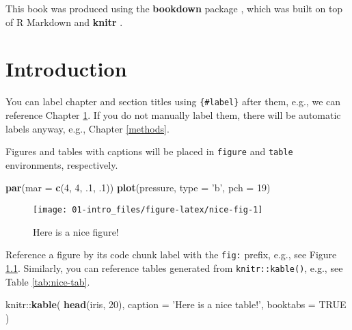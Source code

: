 \documentclass[]{book}
\newenvironment{Shaded}{\begin{snugshade}}{\end{snugshade}}
\newcommand{\KeywordTok}[1]{\textcolor[rgb]{0.13,0.29,0.53}{\textbf{{#1}}}}
\newcommand{\DataTypeTok}[1]{\textcolor[rgb]{0.13,0.29,0.53}{{#1}}}
\newcommand{\DecValTok}[1]{\textcolor[rgb]{0.00,0.00,0.81}{{#1}}}
\newcommand{\StringTok}[1]{\textcolor[rgb]{0.31,0.60,0.02}{{#1}}}
\newcommand{\OtherTok}[1]{\textcolor[rgb]{0.56,0.35,0.01}{{#1}}}
\newcommand{\NormalTok}[1]{{#1}}
\theoremstyle{definition}
\theoremstyle{definition}
\theoremstyle{remark}
\begin{document}
This book was produced using the \textbf{bookdown} package
\citep{R-bookdown}, which was built on top of R Markdown and
\textbf{knitr} \citep{xie2015}.

\chapter{Introduction}\label{intro}

You can label chapter and section titles using \texttt{\{\#label\}}
after them, e.g., we can reference Chapter \ref{intro}. If you do not
manually label them, there will be automatic labels anyway, e.g.,
Chapter \ref{methods}.

Figures and tables with captions will be placed in \texttt{figure} and
\texttt{table} environments, respectively.

\begin{Shaded}
\begin{Highlighting}[]
\KeywordTok{par}\NormalTok{(}\DataTypeTok{mar =} \KeywordTok{c}\NormalTok{(}\DecValTok{4}\NormalTok{, }\DecValTok{4}\NormalTok{, .}\DecValTok{1}\NormalTok{, .}\DecValTok{1}\NormalTok{))}
\KeywordTok{plot}\NormalTok{(pressure, }\DataTypeTok{type =} \StringTok{'b'}\NormalTok{, }\DataTypeTok{pch =} \DecValTok{19}\NormalTok{)}
\end{Highlighting}
\end{Shaded}

\begin{figure}

{\centering \texttt{[image: 01-intro\_files/figure-latex/nice-fig-1]} 

}

\caption{Here is a nice figure!}\label{fig:nice-fig}
\end{figure}

Reference a figure by its code chunk label with the \texttt{fig:}
prefix, e.g., see Figure \ref{fig:nice-fig}. Similarly, you can
reference tables generated from \texttt{knitr::kable()}, e.g., see Table
\ref{tab:nice-tab}.

\begin{Shaded}
\begin{Highlighting}[]
\NormalTok{knitr::}\KeywordTok{kable}\NormalTok{(}
  \KeywordTok{head}\NormalTok{(iris, }\DecValTok{20}\NormalTok{), }\DataTypeTok{caption =} \StringTok{'Here is a nice table!'}\NormalTok{,}
  \DataTypeTok{booktabs =} \OtherTok{TRUE}
\NormalTok{)}
\end{Highlighting}
\end{Shaded}
\end{document}
